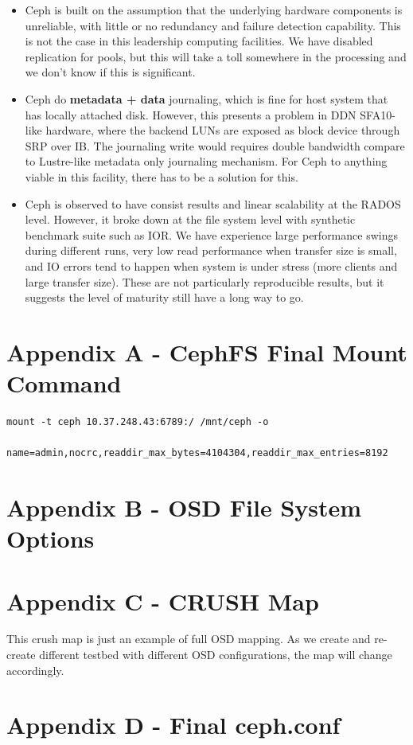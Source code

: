 \documentclass{article}
\begin{document}
\begin{itemize}

  \item Ceph is built on the assumption that the underlying hardware components
  is unreliable, with little or no redundancy and failure detection capability.
  This is not the case in this leadership computing facilities. We have disabled
  replication for pools, but this will take a toll somewhere in the processing
  and we don't know if this is significant.

  \item Ceph do \textbf{metadata + data} journaling, which is fine for host
  system that has locally attached disk. However, this presents a problem in DDN
  SFA10-like hardware, where the backend LUNs are exposed as block device
  through SRP over IB. The journaling write would requires double bandwidth
  compare to Lustre-like metadata only journaling mechanism. For Ceph to anything
  viable in this facility, there has to be a solution for this.

  \item Ceph is observed to have consist results and linear scalability at the
  RADOS level. However, it broke down at the file system level with synthetic
  benchmark suite such as IOR. We have experience large performance swings
  during different runs, very low read performance when transfer size is small,
  and IO errors tend to happen when system is under stress (more clients and
  large transfer size). These are not particularly reproducible results, but it
  suggests the level of maturity still have a long way to go.
  
\end{itemize}

\section*{Appendix A - CephFS Final Mount Command}

\begin{Verbatim}
mount -t ceph 10.37.248.43:6789:/ /mnt/ceph -o
      name=admin,nocrc,readdir_max_bytes=4104304,readdir_max_entries=8192
\end{Verbatim}


\section*{Appendix B - OSD File System Options}



\section*{Appendix C - CRUSH Map}

This crush map is just an example of full OSD mapping. As we create and
re-create different testbed with different OSD configurations, the map will
change accordingly.




\section*{Appendix D - Final ceph.conf}



\end{document}
